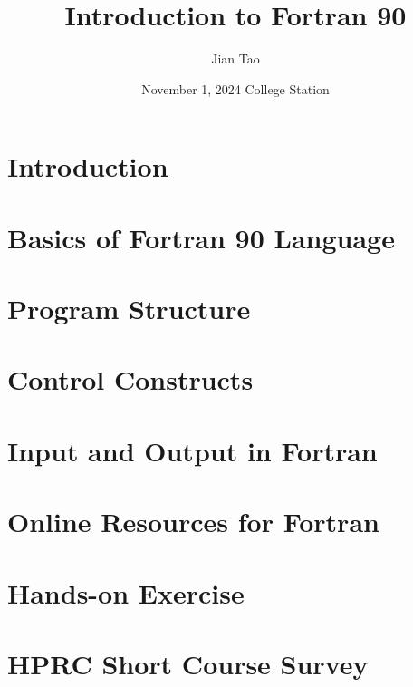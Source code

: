 
\title[Texas A\&M HPRC Short Course]{Introduction to Fortran 90}
\author[Jian Tao]{Jian Tao}
\date{November 1, 2024 College Station}

\frame{\titlepage}
\frame{\tableofcontents}
\section{Introduction}
  
\section{Basics of Fortran 90 Language}
  
\section{Program Structure}
  
\section{Control Constructs}
    
\section{Input and Output in Fortran}
  
\section{Online Resources for Fortran}
    
\section{Hands-on Exercise}
  
\section{HPRC Short Course Survey}
  

